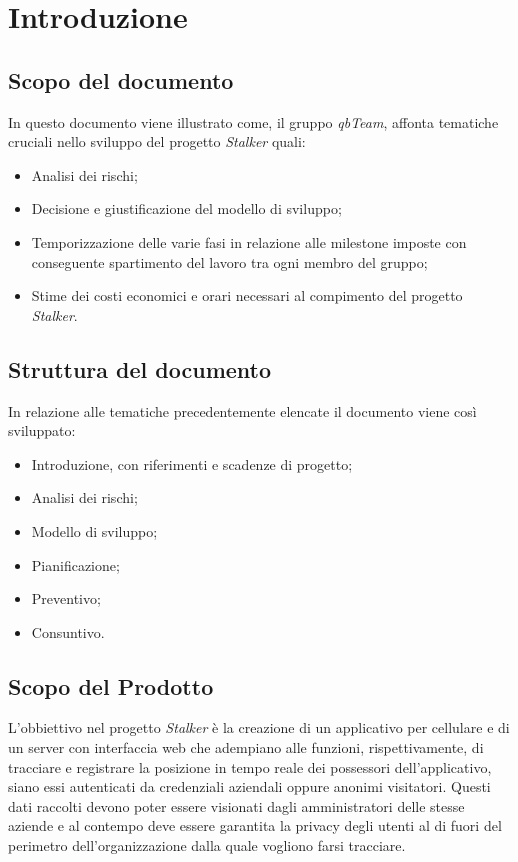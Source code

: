 \section{Introduzione}
\subsection{Scopo del documento}
In questo documento viene illustrato come, il gruppo \textit{qbTeam}, affonta tematiche cruciali nello sviluppo del progetto \textit{Stalker} quali:
\begin{itemize}
    \item Analisi dei rischi;
    \item Decisione e giustificazione del modello di sviluppo;
    \item Temporizzazione delle varie fasi in relazione alle milestone imposte con conseguente spartimento del lavoro tra ogni membro del gruppo;
    \item Stime dei costi economici e orari necessari al compimento del progetto \textit{Stalker}.
\end{itemize}

\subsection{Struttura del documento}
In relazione alle tematiche precedentemente elencate il documento viene così sviluppato:
\begin{itemize}
    \item Introduzione, con riferimenti e scadenze di progetto;
    \item Analisi dei rischi;
    \item Modello di sviluppo;
    \item Pianificazione;
    \item Preventivo;
    \item Consuntivo.
\end{itemize}

\subsection{Scopo del Prodotto}
L'obbiettivo nel progetto \textit{Stalker} è la creazione di un applicativo per cellulare e di un server con interfaccia web che adempiano alle funzioni, rispettivamente, di 
tracciare e registrare la posizione in tempo reale dei possessori dell'applicativo, siano essi autenticati da credenziali aziendali oppure anonimi visitatori.
Questi dati raccolti devono poter essere visionati dagli amministratori delle stesse aziende e al contempo deve essere garantita la privacy degli utenti al di fuori del perimetro dell'organizzazione dalla quale vogliono farsi tracciare.

